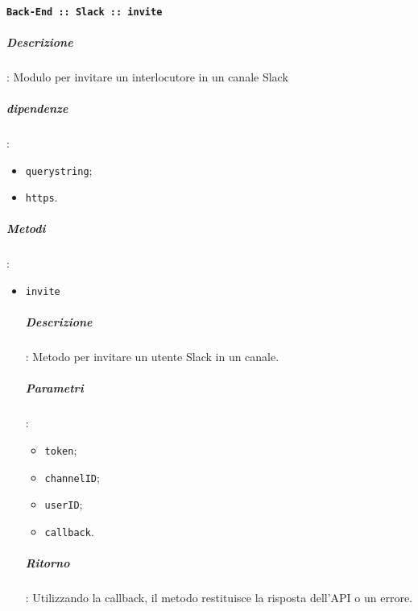 \documentclass[../DefinizioneDiProdotto_v2.0.0.tex]{subfiles}
\begin{document}
\paragraph{\texttt{Back-End :: Slack :: invite}}
\subparagraph{Descrizione}: Modulo per invitare un interlocutore in un canale Slack
\subparagraph{dipendenze}:
\begin{itemize}
	\item \texttt{querystring};
	\item \texttt{https}.
\end{itemize}
\subparagraph{Metodi}:
\begin{itemize}
	\item \texttt{invite}
	      \subparagraph{Descrizione}: Metodo per invitare un utente Slack in un canale.
	      \subparagraph{Parametri}:
	      \begin{itemize}
	      	\item \texttt{token};
	      	\item \texttt{channelID};
	      	\item \texttt{userID};
	      	\item \texttt{callback}.
	      \end{itemize}
	      \subparagraph{Ritorno}: Utilizzando la callback, il metodo restituisce la risposta dell'API o un errore.
\end{itemize}
\end{document}
